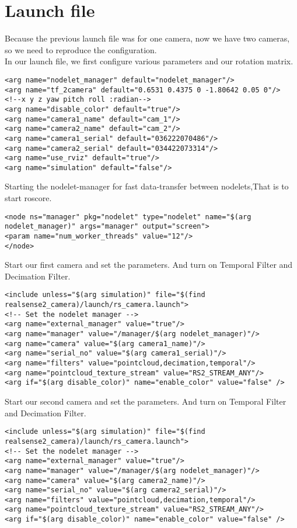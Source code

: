 \section{Launch file}
Because the previous launch file was for one camera, now we have two cameras, so we need to reproduce the configuration.\\
In our launch file, we first configure various parameters and our rotation matrix.\\
\begin{lstlisting}[caption={}]
<arg name="nodelet_manager" default="nodelet_manager"/>
<arg name="tf_2camera" default="0.6531 0.4375 0 -1.80642 0.05 0"/>   <!--x y z yaw pitch roll :radian--> 
<arg name="disable_color" default="true"/>
<arg name="camera1_name" default="cam_1"/>
<arg name="camera2_name" default="cam_2"/>
<arg name="camera1_serial" default="036222070486"/>
<arg name="camera2_serial" default="034422073314"/>
<arg name="use_rviz" default="true"/>
<arg name="simulation" default="false"/>
\end{lstlisting}
Starting the nodelet-manager for fast data-transfer between nodelets,That is to start roscore.\\
\begin{lstlisting}[caption={}]
<node ns="manager" pkg="nodelet" type="nodelet" name="$(arg nodelet_manager)" args="manager" output="screen">
<param name="num_worker_threads" value="12"/>
</node>
\end{lstlisting}	


Start our first camera and set the parameters. And turn on Temporal Filter and Decimation Filter.\\
\begin{lstlisting}[caption={}]
<include unless="$(arg simulation)" file="$(find realsense2_camera)/launch/rs_camera.launch">
<!-- Set the nodelet manager -->
<arg name="external_manager" value="true"/>
<arg name="manager" value="/manager/$(arg nodelet_manager)"/>
<arg name="camera" value="$(arg camera1_name)"/>
<arg name="serial_no" value="$(arg camera1_serial)"/>
<arg name="filters" value="pointcloud,decimation,temporal"/>
<arg name="pointcloud_texture_stream" value="RS2_STREAM_ANY"/>
<arg if="$(arg disable_color)" name="enable_color" value="false" /> 
\end{lstlisting}

Start our second camera and set the parameters. And turn on Temporal Filter and Decimation Filter.\\
\begin{lstlisting}[caption={}]
<include unless="$(arg simulation)" file="$(find realsense2_camera)/launch/rs_camera.launch">
<!-- Set the nodelet manager -->
<arg name="external_manager" value="true"/>
<arg name="manager" value="/manager/$(arg nodelet_manager)"/>
<arg name="camera" value="$(arg camera2_name)"/>
<arg name="serial_no" value="$(arg camera2_serial)"/>
<arg name="filters" value="pointcloud,decimation,temporal"/>
<arg name="pointcloud_texture_stream" value="RS2_STREAM_ANY"/>
<arg if="$(arg disable_color)" name="enable_color" value="false" /> 
\end{lstlisting}

